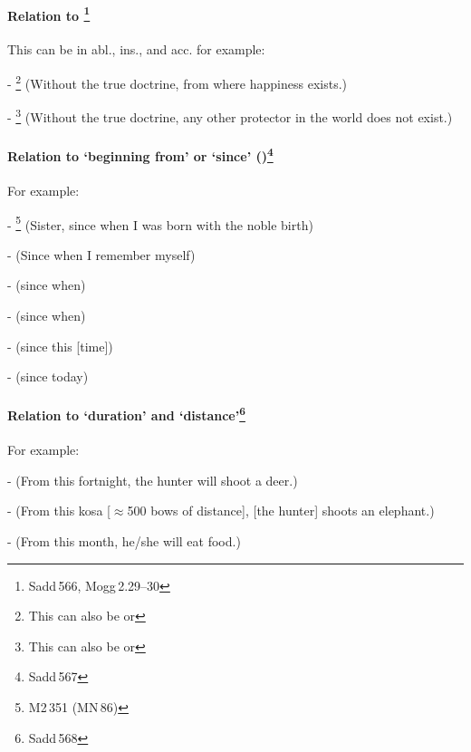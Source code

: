 \paragraph*{Relation to \footnote{Sadd\,566, Mogg\,2.29--30}} This can be in abl., ins., and acc. for example:\par
- \footnote{This can also be  or } (Without the true doctrine, from where happiness exists.)\par
- \footnote{This can also be  or } (Without the true doctrine, any other protector in the world does not exist.)\par

\paragraph*{Relation to `beginning from' or `since' ()\footnote{Sadd\,567}} For example:\par
- \footnote{M2\,351 (MN\,86)} (Sister, since when I was born with the noble birth)\par
-  (Since when I remember myself)\par
-  (since when)\par
-  (since when)\par
-  (since this [time])\par
-  (since today)\par

\paragraph*{Relation to `duration' and `distance'\footnote{Sadd\,568}} For example:\par
-  (From this fortnight, the hunter will shoot a deer.)\par
-  (From this kosa [$\approx$500 bows of distance], [the hunter] shoots an elephant.)\par
-  (From this month, he/she will eat food.)\par

